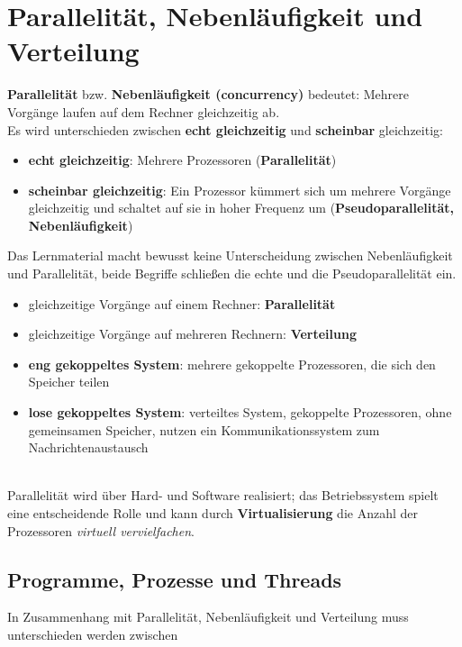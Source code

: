 \chapter{Parallelität, Nebenläufigkeit und Verteilung}


\textbf{Parallelität} bzw. \textbf{Nebenläufigkeit (concurrency)} bedeutet: Mehrere Vorgänge laufen auf dem Rechner gleichzeitig ab.\\

Es wird unterschieden zwischen \textbf{echt gleichzeitig} und \textbf{scheinbar} gleichzeitig:
\begin{itemize}
    \item \textbf{echt gleichzeitig}: Mehrere Prozessoren (\textbf{Parallelität})
    \item \textbf{scheinbar gleichzeitig}: Ein Prozessor kümmert sich um mehrere Vorgänge gleichzeitig und schaltet auf sie in hoher Frequenz um (\textbf{Pseudoparallelität, Nebenläufigkeit})
\end{itemize}

Das Lernmaterial macht bewusst keine Unterscheidung zwischen Nebenläufigkeit und Parallelität, beide Begriffe schließen die echte und die Pseudoparallelität ein.

\begin{itemize}[label=$\rightarrow$]
    \item gleichzeitige Vorgänge auf einem Rechner: \textbf{Parallelität}
    \item gleichzeitige Vorgänge auf mehreren Rechnern: \textbf{Verteilung}
    \item \textbf{eng gekoppeltes System}: mehrere gekoppelte Prozessoren, die sich den Speicher teilen
    \item \textbf{lose gekoppeltes System}: verteiltes System, gekoppelte Prozessoren, ohne gemeinsamen Speicher, nutzen ein Kommunikationssystem zum Nachrichtenaustausch
\end{itemize}\\

Parallelität wird über Hard- und Software realisiert; das Betriebssystem spielt eine entscheidende Rolle und kann durch \textbf{Virtualisierung} die Anzahl der Prozessoren \textit{virtuell vervielfachen}.

\section{Programme, Prozesse und Threads}

In Zusammenhang mit Parallelität, Nebenläufigkeit und Verteilung muss unterschieden werden zwischen

